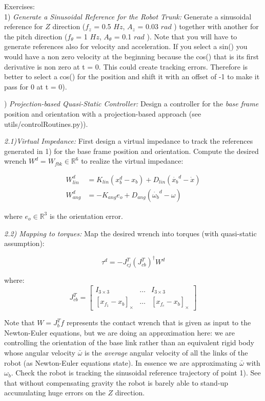 \documentclass[11pt]{article}
\newcommand{\Rnum}{\mathbb{R}} %
\newcommand{\mat}[1]{\ensuremath{\begin{bmatrix}#1\end{bmatrix}}}	%
\begin{document}
\noindent Exercises:\\
1) \textit{Generate a Sinusoidal Reference for the Robot Trunk:} 
Generate a sinusoidal reference for $Z$ direction ($f_z$ = 0.5 $Hz$, $A_z$ = 0.03 $rad$ )
together with another for the pitch direction ($f_{\theta}$ = 1 $Hz$, $A_{\theta}$ = 0.1 $rad$ ). Note that you will have to generate references also for velocity and acceleration. If you select a sin() you would have a non zero velocity at the beginning because the cos() that is its first derivative is non zero at t = 0. This could create tracking errors. Therefore is better to select a cos() for the position and shift it with an offset of -1 to make it pass for 0 at t = 0). 

\quad
 
) \textit{Projection-based Quasi-Static Controller:} 
Design a controller for the \textit{base frame} position and orientation with a projection-based approach (see utils/controlRoutines.py)).

\quad

\noindent  
 \textit{2.1)Virtual Impedance:}
First design a virtual impedance to track the references generated in 1) for the base frame position and orientation. 
Compute the desired wrench $W^d = W_{fbk} \in\Rnum^6$ to realize the virtual impedance:

\begin{align}
W^d_{lin} & = K_{lin} (x^d_b - x_b ) + D_{lin} (\dot{x_b}^d - \dot{x})   \\
W^d_{ang} &=  - K_{ang} e_o + D_{ang} (\dot{\omega_b}^d - \omega)
\end{align}

where $e_o \in \Rnum^3$ is the orientation error. 

\quad

\noindent  
\textit{2.2) Mapping to torques:}
Map the desired wrench into torques (with quasi-static assumption):

\begin{equation}
\tau^d = -J_{cj}^T(J_{cb}^T)^{\dagger} W^d
\end{equation}

where:
\begin{equation}
J_{cb}^T = \mat{I_{3\times3} & \dots & I_{3\times3} \\
			[x_{f_1} - x_b]_{\times} & \dots & [x_{f_c} - x_b]_{\times}}
\label{eq:newton-euler}
\end{equation}


Note that $W = J_b^Tf$ represents the contact wrench that is given as input to the Newton-Euler equations, but we are doing an approximation here: we are controlling the orientation of the base link rather than an equivalent rigid body whose angular velocity $\bar{\omega}$ is the \textit{average} angular velocity of all the links of the robot (as Newton-Euler equations state). In essence we are approximating  $\bar{\omega}$ with ${\omega}_b$.
Check the robot is tracking the sinusoidal reference trajectory of point 1). 
See that without compensating gravity the robot is barely able to stand-up accumulating huge errors on the $Z$ direction.
\end{document}
